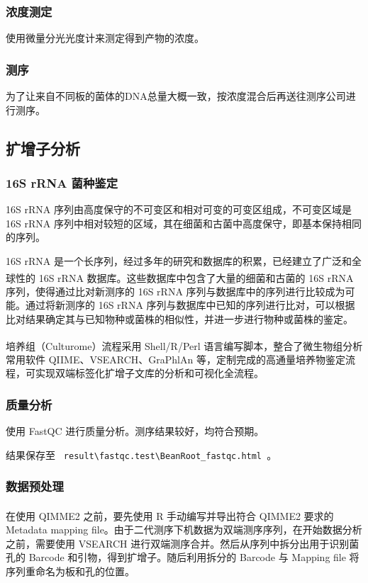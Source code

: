\documentclass[UTF8]{ctexart}
\begin{document}
    \subsubsection{浓度测定}
    使用微量分光光度计来测定得到产物的浓度。

    \subsubsection{测序}
    为了让来自不同板的菌体的DNA总量大概一致，按浓度混合后再送往测序公司进行测序。


    \subsection{扩增子分析}

    \subsubsection{16S rRNA 菌种鉴定}
    16S rRNA 序列由高度保守的不可变区和相对可变的可变区组成，不可变区域是 16S rRNA 序列中相对较短的区域，其在细菌和古菌中高度保守，即基本保持相同的序列。
    
    16S rRNA 是一个长序列，经过多年的研究和数据库的积累，已经建立了广泛和全球性的 16S rRNA 数据库\textsuperscript{\cite{ref3}}。这些数据库中包含了大量的细菌和古菌的 16S rRNA 序列，使得通过比对新测序的 16S rRNA 序列与数据库中的序列进行比较成为可能。通过将新测序的 16S rRNA 序列与数据库中已知的序列进行比对，可以根据比对结果确定其与已知物种或菌株的相似性，并进一步进行物种或菌株的鉴定。

    培养组（Culturome）流程\textsuperscript{\cite{ref4}}采用 Shell/R/Perl 语言编写脚本，整合了微生物组分析常用软件 QIIME、VSEARCH、GraPhlAn 等，定制完成的高通量培养物鉴定流程，可实现双端标签化扩增子文库的分析和可视化全流程。

    \subsubsection{质量分析}
    使用 FastQC 进行质量分析。测序结果较好，均符合预期。

    结果保存至 \verb| result\fastqc.test\BeanRoot_fastqc.html |。

    \subsubsection{数据预处理}
    在使用 QIMME2 之前，要先使用 R 手动编写并导出符合 QIMME2 要求\textsuperscript{\cite{ref5}}的 Metadata mapping file。由于二代测序下机数据为双端测序序列，在开始数据分析之前，需要使用 VSEARCH 进行双端测序合并。然后从序列中拆分出用于识别菌孔的 Barcode 和引物，得到扩增子。随后利用拆分的 Barcode 与 Mapping file 将序列重命名为板和孔的位置。
\end{document}
